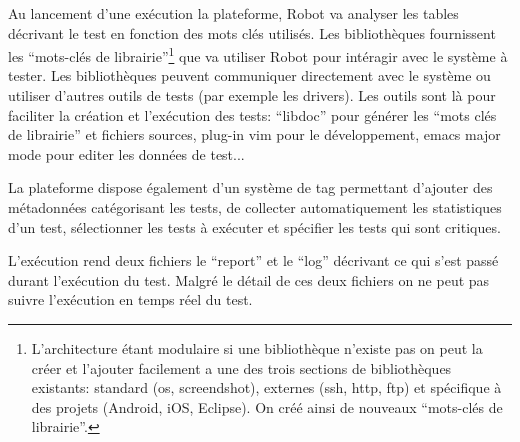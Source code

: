 Au lancement d'une exécution la plateforme, Robot va analyser les tables décrivant le test en fonction des mots clés utilisés. Les bibliothèques fournissent les ``mots-clés de librairie''\footnote{L'architecture étant modulaire si une bibliothèque n'existe pas on peut la créer et l'ajouter facilement a une des trois sections de bibliothèques existants: standard (os, screendshot), externes (ssh, http, ftp) et spécifique à des projets (Android, iOS, Eclipse). On créé ainsi de nouveaux ``mots-clés de librairie''.} que va utiliser Robot pour intéragir avec le système à tester. Les bibliothèques peuvent communiquer directement avec le système ou utiliser d'autres outils de tests (par exemple les drivers). Les outils sont là pour faciliter la création et l'exécution des tests: ``libdoc'' pour générer les ``mots clés de librairie'' et fichiers sources, plug-in vim pour le développement, emacs major mode pour editer les données de test... 

La plateforme dispose également d'un système de tag permettant d'ajouter des métadonnées catégorisant les tests, de collecter automatiquement les statistiques d'un test, sélectionner les tests à exécuter et spécifier les tests qui sont critiques. 

L'exécution rend deux fichiers le ``report'' et le ``log'' décrivant ce qui s'est passé durant l'exécution du test. Malgré le détail de ces deux fichiers on ne peut pas suivre l'exécution en temps réel du test.

